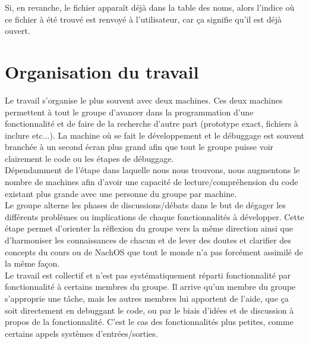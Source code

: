 \documentclass{report}
\begin{document}
Si, en revanche, le fichier apparaît déjà dans la table des noms, alors l'indice où ce fichier à été trouvé est renvoyé à l'utilisateur, car ça signifie qu'il est déjà ouvert.

\section*{Organisation du travail}
Le travail s'organise le plus souvent avec deux machines. Ces deux machines permettent à tout le groupe d'avancer dans la programmation d'une fonctionnalité et de faire de la recherche d'autre part (prototype exact, fichiers à inclure etc...). La machine où se fait le développement et le débuggage est souvent branchée à un second écran plus grand afin que tout le groupe puisse voir clairement le code ou les étapes de débuggage.\\

Dépendamment de l'étape dans laquelle nous nous trouvons, nous augmentons le nombre de machines afin d'avoir une capacité de lecture/compréhension du code existant plus grande avec une personne du groupe par machine.\\

Le groupe alterne les phases de discussions/débats dans le but de dégager les différents problèmes ou implications de chaque fonctionnalités à développer. Cette étape permet d'orienter la réflexion du groupe vers la même direction ainsi que d'harmoniser les connaissances de chacun et de lever des doutes et clarifier des concepts du cours ou de NachOS que tout le monde n'a pas forcément assimilé de la même façon.\\

Le travail est collectif et n'est pas systématiquement réparti fonctionnalité par fonctionnalité à certains membres du groupe. Il arrive qu'un membre du groupe s'approprie une tâche, mais les autres membres lui apportent de l'aide, que ça soit directement en debuggant le code, ou par le biais d'idées et de discussion à propos de la fonctionnalité. C'est le cas des fonctionnalités plus petites, comme certains appels systèmes d'entrées/sorties.
\end{document}
